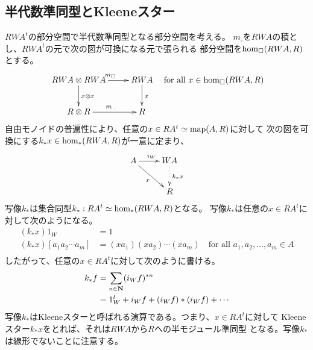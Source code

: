 	\subsection{半代数準同型とKleeneスター}\label{s2:半代数準同型とKleeneスター} %
		$RWA^t$の部分空間で半代数準同型となる部分空間を考える。
		$m_\square$を$RWA$の積とし、$RWA^t$の元で次の図が可換になる元で張られる
		部分空間を$\operatorname{hom}_\square(RWA,R)$とする。
		\begin{equation}\label{eq:半モジュール準同型の可換図}
			\xymatrix{
				RWA\otimes RWA \ar[d]^{x\otimes x} \ar[r]^{m_\square} 
					& RWA \ar[d]^{x} \\
				R\otimes R \ar[r]^{m_\myspace} & R \\
			}\quad\text{for all }x\in \homset_\square(RWA,R)
		\end{equation}
		自由モノイドの普遍性により、任意の$x\in RA^t\simeq \operatorname{map}(A,R)$に対して
		次の図を可換にする$k_*x\in \operatorname{hom}_*(RWA,R)$が一意に定まり、
		\begin{equation*}\begin{split} %
			\xymatrix{
				A \ar[dr]_{x} \ar[r]^{i_W} & WA \ar@{.>}[d]^{k_*x} \\
				& R \\
			} \\
		\end{split}\end{equation*} %
		写像$k_*$は集合同型$k_*:RA^t\simeq \operatorname{hom}_*(RWA,R)$となる。
		写像$k_*$は任意の$x\in RA^t$に対して次のようになる。
		\begin{equation*}\begin{split} %
			(k_*x)1_W &= 1 \\
			(k_*x)[a_1a_2\cdots a_m] &= (xa_1)(xa_2)\cdots(xa_m)
				\quad\text{for all }a_1,a_2,\dots,a_m\in A \\
		\end{split}\end{equation*} %
		したがって、任意の$x\in RA^t$に対して次のように書ける。
		\begin{equation*}\begin{split} %
			k_*f &= \sum_{n\in\mybf{N}}(i_Wf)^{*n} \\
			&= 1_W^t + i_Wf + (i_Wf)*(i_Wf) + \cdots \\
		\end{split}\end{equation*} %
		写像$k_*$はKleeneスターと呼ばれる演算である。つまり、$x\in RA^t$に対して
		Kleeneスター$k_*x$をとれば、それは$RWA$から$R$への半モジュール準同型
		となる。写像$k_*$は線形でないことに注意する。
